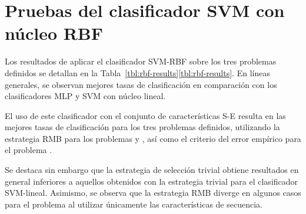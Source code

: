 %
%
%
\section{Pruebas del clasificador SVM con núcleo RBF}
%
Los resultados de aplicar el clasificador SVM-RBF sobre los tres
problemas definidos se detallan en la
\iflatexml{}Tabla~\ref{tbl:rbf-results}\else\autoref{tbl:rbf-results}\fi.
En líneas generales, se observan mejores tasas de clasificación en
comparación con los clasificadores MLP y SVM con núcleo lineal.

El uso de este clasificador con el conjunto de características S-E
resulta en las mejores tasas de clasificación para los tres problemas
definidos, utilizando la estrategia RMB para los problemas
\tripletsvm{} y \micropred{}, así como el criterio del error empírico
para el problema \mipred{}.

Se destaca sin embargo que la estrategia de selección trivial obtiene
resultados en general inferiores a aquellos obtenidos con la
estrategia trivial para el clasificador SVM-lineal.
Asimismo, se observa que la estrategia RMB diverge en algunos casos
para el problema \mipred{} al utilizar únicamente las características
de secuencia.
